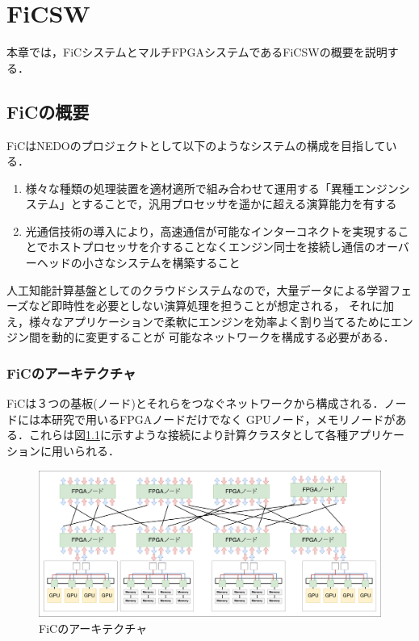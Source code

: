 \chapter{FiCSW}
{
  \label{chap:ficsw}
  本章では，FiCシステムとマルチFPGAシステムであるFiCSWの概要を説明する．
  
  \section{FiCの概要}
  \label{sec:about_fic}
  FiCはNEDOのプロジェクトとして以下のようなシステムの構成を目指している．
  
  \begin{enumerate}
    \item 様々な種類の処理装置を適材適所で組み合わせて運用する「異種エンジンシステム」とすることで，汎用プロセッサを遥かに超える演算能力を有する
    \item 光通信技術の導入により，高速通信が可能なインターコネクトを実現することでホストプロセッサを介することなくエンジン同士を接続し通信のオーバーヘッドの小さなシステムを構築すること
  \end{enumerate}
  
  人工知能計算基盤としてのクラウドシステムなので，大量データによる学習フェーズなど即時性を必要としない演算処理を担うことが想定される，
  それに加え，様々なアプリケーションで柔軟にエンジンを効率よく割り当てるためにエンジン間を動的に変更することが
  可能なネットワークを構成する必要がある．
  
  \subsection{FiCのアーキテクチャ}
  \label{sec:arch_fic}
  FiCは３つの基板(ノード)とそれらをつなぐネットワークから構成される．ノードには本研究で用いるFPGAノードだけでなく
  GPUノード，メモリノードがある．これらは図\ref{fig:arch_fic}に示すような接続により計算クラスタとして各種アプリケーションに用いられる．
  
  \begin{figure}[h]
    \centering
    \includegraphics[width=15cm]{./chap3/fig/arch_fic.pdf}
    \caption{FiCのアーキテクチャ}
    \label{fig:arch_fic}
  \end{figure}
  
}
